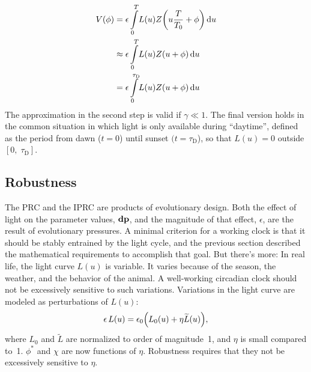 \begin{equation}\label{eq:convolution}
\begin{aligned}
V(\phi)&=\epsilon \int_{0}^{T}\! 
L(u)Z\qty(u\frac{T}{{T}_{0}}+\phi) \id{u}
\\
&\approx\epsilon \int_{0}^{T}\!
L(u)Z(u+\phi)\id{u}
\\
&=\epsilon \int _{0}^{\tau_\text{D}}\!
L(u)Z(u+\phi)\id{u}
\end{aligned}
\end{equation}
The approximation in the second step is valid if $\gamma\ll1$. The
final version holds in the common situation in which light is only
available during ``daytime'', defined as the period from dawn ($t=0$)
until sunset $(t=\tau_\text{D}$), so that $L(u)=0$ outside
 $[0,\;\tau_\text{D}]$. 





\subsection{Robustness}
The PRC and the IPRC are products of evolutionary design. Both the
effect of light on the parameter values, $\vb{dp}$, and the
magnitude of that effect, $\epsilon $, are the result of
evolutionary pressures. A minimal criterion for a working clock is
that it should be stably entrained by the light cycle, and the
previous section described the mathematical requirements to
accomplish that goal. But there's more: In real life, the light curve
 $L(u)$ is variable. It varies because of the season, the weather,
and the behavior of the animal. A well-working circadian clock should
not be excessively sensitive to such variations. Variations in the
light curve are modeled as perturbations of $L(u)$:
\begin{equation}
\epsilon\,L(u)
=\epsilon_{0}\qty({L}_{0}(u)+\eta \widetilde{{L}}(u)),
\end{equation}
where ${L}_{0}$ and $\widetilde{{L}}$ are normalized to order of
magnitude~1, and $\eta$ is small compared to~1. $\phi^{*}$ and $\chi$
are now functions of $\eta$. Robustness requires that they not be
excessively sensitive to $\eta$.

